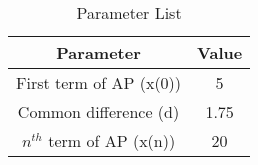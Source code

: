 \begin{table}[ht]
    \centering
    \begin{tabular}{|c|c|}
        \hline
        Parameter & Value \\
        \hline
        First term of AP (x(0)) & 5 \\
        \hline
        Common difference (d) & 1.75 \\
        \hline
        $n^{th}$ term of AP (x(n)) & 20 \\
        \hline
    \end{tabular}
    \vspace{2mm}
    \caption{Parameter List}
    \label{tab:simple}
\end{table}
